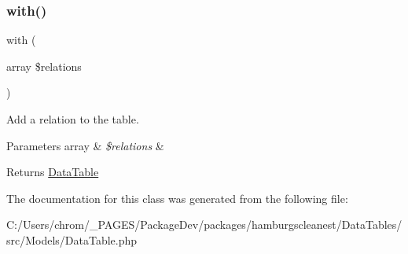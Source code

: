 \subsubsection{\texorpdfstring{with()}{with()}}
{\footnotesize\ttfamily with (\begin{DoxyParamCaption}\item[{array}]{\$relations }\end{DoxyParamCaption})}

Add a relation to the table.


\begin{DoxyParams}[1]{Parameters}
array & {\em \$relations} & \\
\hline
\end{DoxyParams}
\begin{DoxyReturn}{Returns}
\hyperlink{classhamburgscleanest_1_1_data_tables_1_1_models_1_1_data_table}{Data\+Table} 
\end{DoxyReturn}


The documentation for this class was generated from the following file\+:\begin{DoxyCompactItemize}
\item 
C\+:/\+Users/chrom/\+\_\+\+P\+A\+G\+E\+S/\+Package\+Dev/packages/hamburgscleanest/\+Data\+Tables/src/\+Models/Data\+Table.\+php\end{DoxyCompactItemize}
